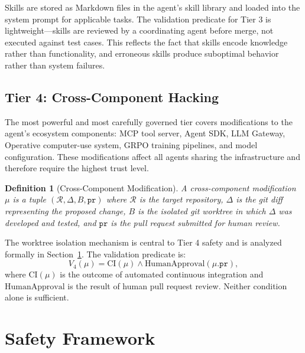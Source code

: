 \documentclass[11pt]{article}
\newtheorem{definition}{Definition}
\begin{document}
Skills are stored as Markdown files in the agent's skill library and loaded
into the system prompt for applicable tasks. The validation predicate for Tier 3
is lightweight---skills are reviewed by a coordinating agent before merge, not
executed against test cases. This reflects the fact that skills encode knowledge
rather than functionality, and erroneous skills produce suboptimal behavior
rather than system failures.

\subsection{Tier 4: Cross-Component Hacking}
\label{sec:tier4}

The most powerful and most carefully governed tier covers modifications to the
agent's ecosystem components: MCP tool server, Agent SDK, LLM Gateway, Operative
computer-use system, GRPO training pipelines, and model configuration. These
modifications affect all agents sharing the infrastructure and therefore require
the highest trust level.

\begin{definition}[Cross-Component Modification]
A \emph{cross-component modification} $\mu$ is a tuple
$(\mathcal{R}, \Delta, B, \texttt{pr})$ where $\mathcal{R}$ is the target
repository, $\Delta$ is the git diff representing the proposed change, $B$ is
the isolated git worktree in which $\Delta$ was developed and tested, and
$\texttt{pr}$ is the pull request submitted for human review.
\end{definition}

The worktree isolation mechanism is central to Tier 4 safety and is analyzed
formally in Section~\ref{sec:safety}. The validation predicate is:
\begin{equation}
    V_4(\mu) = \text{CI}(\mu) \wedge \text{HumanApproval}(\mu.\texttt{pr}),
\end{equation}
where $\text{CI}(\mu)$ is the outcome of automated continuous integration and
$\text{HumanApproval}$ is the result of human pull request review. Neither
condition alone is sufficient.

\section{Safety Framework}
\label{sec:safety}
\end{document}
